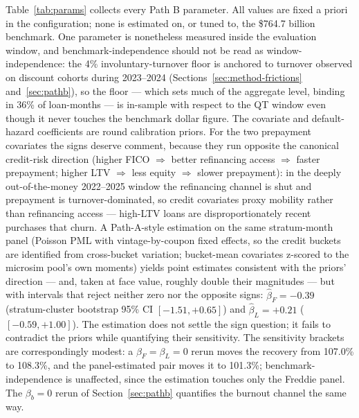 \documentclass[12pt]{article}
\begin{document}
Table~\ref{tab:params} collects every Path B parameter. All values are fixed a priori in the configuration; none is estimated on, or tuned to, the \$764.7 billion benchmark. One parameter is nonetheless measured inside the evaluation window, and benchmark-independence should not be read as window-independence: the 4\% involuntary-turnover floor is anchored to turnover observed on discount cohorts during 2023--2024 (Sections~\ref{sec:method-frictions} and~\ref{sec:pathb}), so the floor --- which sets much of the aggregate level, binding in 36\% of loan-months --- is in-sample with respect to the QT window even though it never touches the benchmark dollar figure. The covariate and default-hazard coefficients are round calibration priors. For the two prepayment covariates the signs deserve comment, because they run opposite the canonical credit-risk direction (higher FICO $\Rightarrow$ better refinancing access $\Rightarrow$ faster prepayment; higher LTV $\Rightarrow$ less equity $\Rightarrow$ slower prepayment): in the deeply out-of-the-money 2022--2025 window the refinancing channel is shut and prepayment is turnover-dominated, so credit covariates proxy mobility rather than refinancing access --- high-LTV loans are disproportionately recent purchases that churn. A Path-A-style estimation on the same stratum-month panel (Poisson PML with vintage-by-coupon fixed effects, so the credit buckets are identified from cross-bucket variation; bucket-mean covariates z-scored to the microsim pool's own moments) yields point estimates consistent with the priors' direction --- and, taken at face value, roughly double their magnitudes --- but with intervals that reject neither zero nor the opposite signs: $\hat{\beta}_F = -0.39$ (stratum-cluster bootstrap 95\% CI $[-1.51, +0.65]$) and $\hat{\beta}_L = +0.21$ ($[-0.59, +1.00]$). The estimation does not settle the sign question; it fails to contradict the priors while quantifying their sensitivity. The sensitivity brackets are correspondingly modest: a $\beta_F = \beta_L = 0$ rerun moves the recovery from 107.0\% to 108.3\%, and the panel-estimated pair moves it to 101.3\%; benchmark-independence is unaffected, since the estimation touches only the Freddie panel. The $\beta_b = 0$ rerun of Section~\ref{sec:pathb} quantifies the burnout channel the same way.
\end{document}
